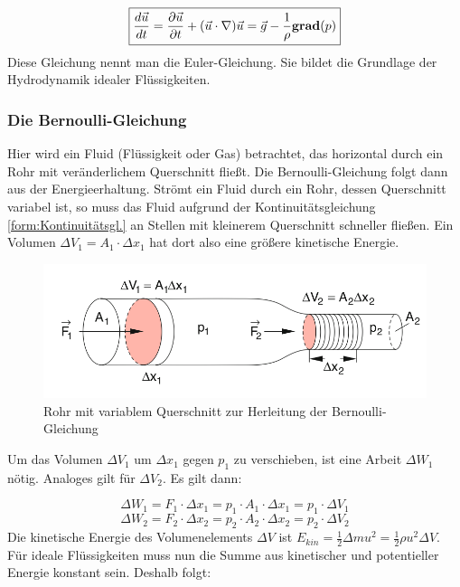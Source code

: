 \begin{equation}
\boxed{\frac{d \vec{u}}{dt} = \frac{\partial \vec{u}}{\partial t} + (\vec{u} \cdot \nabla) \vec{u} = \vec{g} - \frac{1}{\rho} {\bf grad} (p)}
\end{equation}
Diese Gleichung nennt man die Euler-Gleichung. Sie bildet die Grundlage der Hydrodynamik idealer Flüssigkeiten.

\subsubsection{Die Bernoulli-Gleichung}
Hier wird ein Fluid (Flüssigkeit oder Gas) betrachtet, das horizontal durch ein Rohr mit veränderlichem Querschnitt fließt. Die Bernoulli-Gleichung folgt dann aus der Energieerhaltung. Strömt ein Fluid durch ein Rohr, dessen Querschnitt variabel ist, so muss das Fluid aufgrund der Kontinuitätsgleichung \ref{form:Kontinuitätsgl.} an Stellen mit kleinerem Querschnitt schneller fließen. Ein Volumen $ \Delta V_1 = A_1 \cdot \Delta x_1 $ hat dort also eine größere kinetische Energie.

\begin{figure}
		\centering
        \includegraphics[width=.9\textwidth]{images/8-8}
\caption{ Rohr mit variablem Querschnitt zur Herleitung der Bernoulli-Gleichung }
\label{fig:8-8}
\end{figure}

Um das Volumen $ \Delta V_1 $ um $ \Delta x_1 $ gegen $ p_1 $ zu verschieben, ist eine Arbeit $ \Delta W_1 $ nötig. Analoges gilt für $ \Delta V_2 $. Es gilt dann:

\begin{equation}
\Delta W_1 = F_1 \cdot \Delta x_1 = p_1 \cdot A_1 \cdot \Delta x_1 = p_1 \cdot \Delta V_1
\end{equation}
\begin{equation}
\Delta W_2 = F_2 \cdot \Delta x_2 = p_2 \cdot A_2 \cdot \Delta x_2 = p_2 \cdot \Delta V_2
\end{equation}
Die kinetische Energie des Volumenelements $ \Delta V $ ist $ E_{kin} = \frac{1}{2} \Delta m u^2 = \frac{1}{2} \rho u^2 \Delta V $. Für ideale Flüssigkeiten muss nun die Summe aus kinetischer und potentieller Energie konstant sein. Deshalb folgt:

